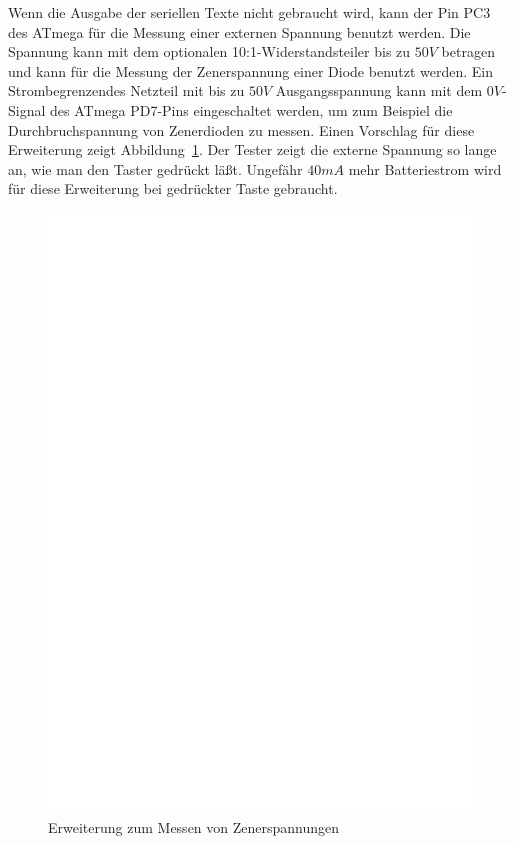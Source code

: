 Wenn die Ausgabe der seriellen Texte nicht gebraucht wird, kann der Pin PC3 des ATmega für die Messung
einer externen Spannung benutzt werden. Die Spannung kann mit dem optionalen 10:1-Widerstandsteiler
bis zu \(50V\) betragen und kann für die Messung der Zenerspannung einer Diode benutzt werden.
Ein Strombegrenzendes Netzteil mit bis zu \(50V\) Ausgangsspannung kann mit dem \(0V\)-Signal des ATmega PD7-Pins
eingeschaltet werden, um zum Beispiel die Durchbruchspannung von Zenerdioden zu messen.
Einen Vorschlag für diese Erweiterung zeigt Abbildung~\ref{fig:zener}.
Der Tester zeigt die externe Spannung so lange an, wie man den Taster gedrückt läßt.
Ungefähr \(40mA\) mehr Batteriestrom wird für diese Erweiterung bei gedrückter Taste gebraucht.

\begin{figure}[H]
\centering
\includegraphics[width=18cm]{../FIG/zener_exp.eps}
\caption{Erweiterung zum Messen von Zenerspannungen}
\label{fig:zener}
\end{figure}


